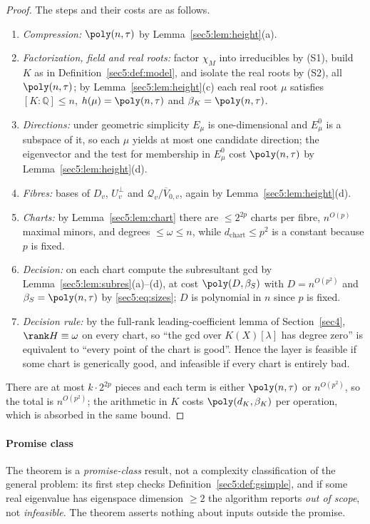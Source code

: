 \begin{proof}
The steps and their costs are as follows.
\begin{enumerate}[label=(\arabic*),leftmargin=*]
\item \emph{Compression:} $\poly(n,\tau)$ by Lemma~\ref{sec5:lem:height}(a).
\item \emph{Factorization, field and real roots:} factor $\chi_M$ into irreducibles by (S1), build $K$
as in Definition~\ref{sec5:def:model}, and isolate the real roots by (S2), all $\poly(n,\tau)$; by
Lemma~\ref{sec5:lem:height}(c) each real root $\mu$ satisfies $[K:\mathbb{Q}]\le n$,
$h(\mu)=\poly(n,\tau)$ and $\beta_K=\poly(n,\tau)$.
\item \emph{Directions:} under geometric simplicity $E_\mu$ is one-dimensional and $E_\mu^0$ is a
subspace of it, so each $\mu$ yields at most one candidate direction; the eigenvector and the test for
membership in $E_\mu^0$ cost $\poly(n,\tau)$ by Lemma~\ref{sec5:lem:height}(d).
\item \emph{Fibres:} bases of $D_v$, $U_v^\perp$ and $\mathcal{Q}_v/\overline{V}_{0,v}$, again by
Lemma~\ref{sec5:lem:height}(d).
\item \emph{Charts:} by Lemma~\ref{sec5:lem:chart} there are $\le2^{2p}$ charts per fibre,
$n^{O(p)}$ maximal minors, and degrees $\le\omega\le n$, while $d_{\mathrm{chart}}\le p^{2}$ is a
constant because $p$ is fixed.
\item \emph{Decision:} on each chart compute the subresultant gcd by
Lemma~\ref{sec5:lem:subres}(a)--(d), at cost $\poly(D,\beta_S)$ with $D=n^{O(p^{2})}$ and
$\beta_S=\poly(n,\tau)$ by \eqref{sec5:eq:sizes}; $D$ is polynomial in $n$ since $p$ is fixed.
\item \emph{Decision rule:} by the full-rank leading-coefficient lemma of Section~\ref{sec4},
$\rank H\equiv\omega$ on every chart, so ``the gcd over $K(X)[\lambda]$ has degree zero'' is equivalent
to ``every point of the chart is good''. Hence the layer is feasible if some chart is generically
good, and infeasible if every chart is entirely bad.
\end{enumerate}
There are at most $k\cdot2^{2p}$ pieces and each term is either $\poly(n,\tau)$ or $n^{O(p^{2})}$, so
the total is $n^{O(p^{2})}$; the arithmetic in $K$ costs $\poly(d_K,\beta_K)$ per operation, which is
absorbed in the same bound.
\end{proof}

\paragraph{Promise class} The theorem is a \emph{promise-class} result, not a complexity
classification of the general problem: its first step checks Definition~\ref{sec5:def:gsimple}, and if
some real eigenvalue has eigenspace dimension $\ge2$ the algorithm reports \emph{out of scope}, not
\emph{infeasible}. The theorem asserts nothing about inputs outside the promise.

